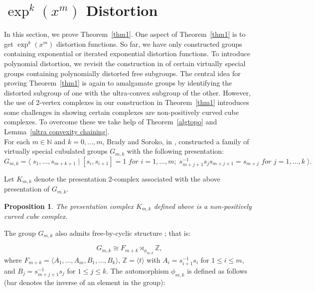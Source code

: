 \documentclass[oneside,11pt,reqno]{amsart}
\newtheorem{prop}[thm]{Proposition}
\theoremstyle{definition}
\begin{document}
\section{${\exp}^k(x^m)$ Distortion}\label{s7}

In this section, we prove Theorem~\ref{thm1}. One aspect of Theorem~\ref{thm1} is to get $\exp^k(x^m)$ distortion functions. So far, we have only constructed groups containing exponential or iterated exponential distortion functions. To introduce polynomial distortion, we revisit the construction in \cite{BS} of certain virtually special groups containing polynomially distorted free subgroups. The central idea for proving Theorem~\ref{thm1} is again to amalgamate groups by identifying the distorted subgroup of one with the ultra-convex subgroup of the other. However, the use of $2$-vertex complexes in our construction in Theorem~\ref{thm1} introduces some challenges in showing certain complexes are non-positively curved cube complexes. To overcome these we take help of Theorem~\ref{algtopo} and Lemma~\ref{ultra convexity chaining}.\\

For each $m \in \mathbb{N}$ and $k=0, \ldots, m$, Brady and Soroko, in \cite{BS}, constructed a family of virtually special cubulated groups $G_{m,k}$ with the following presentation: $$G_{m,k} = \langle \; s_1, \ldots, s_{m+k+1} \; | \;[s_i,s_{i+1}]=1 \textit{ for } i = 1, \ldots, m ; \; s^{-1}_{m+j+1}s_js_{m+j+1}=s_{m+j} \textit{ for } j=1, \ldots, k \; \rangle.$$ 

Let $K_{m,k}$ denote the presentation $2$-complex associated with the above presentation of $G_{m,k}$. 

\begin{prop}\cite[Proposition 5.1]{BS} \label{kmk} The presentation complex $K_{m,k}$ defined above is a non-positively curved cube complex.
\end{prop}


The group $G_{m,k}$ also admits free-by-cyclic structure \cite[Proposition 5.4]{BS}; that is:

$$G_{m,k} \cong F_{m+k} \rtimes_{\phi_{m,k}} \mathbb{Z},$$
where $F_{m+k} = \langle A_1, \ldots, A_m,B_1, \ldots, B_k \rangle$, $\mathbb{Z}= \langle t \rangle$ with $A_i = s^{-1}_{i+1}s_i$ for $1 \leq i \leq m$, and $B_j = s^{-1}_{m+j+1}s_j$ for $ 1 \leq j \leq k$. The automorphism $\phi_{m,k}$ is defined as follows (bar denotes the inverse of an element in the group):
\end{document}
